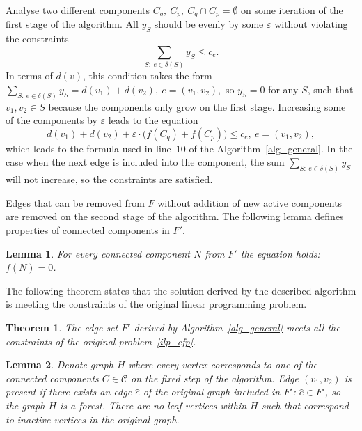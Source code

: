 \documentclass[12pt]{article}
\newtheorem{lemma}{Lemma}
\newtheorem{theorem}{Theorem}
\begin{document}
Analyse two different components $C_q,~C_p,~C_q\cap C_p=\emptyset$ on some iteration of the first stage of the algorithm. All $y_S$ should be evenly by some $\varepsilon$ without violating the constraints
 \[\sum\limits_ {S:~e\in \delta(S)}y_S\leqslant c_e. \]
In terms of $d(v)$, this condition takes the form~$\sum\limits_{S:~e\in \delta(S)}y_S = d(v_1)+d(v_2),~e=(v_1,v_2),$
so $y_S=0$ for any $S$, such that $v_1, v_2\in S$ because the components only grow on the first stage. Increasing some of the components by $\varepsilon$ leads to the  equation
 \[d(v_1)+d(v_2)+\varepsilon\cdot \bigl(f(C_q)+f(C_p)\bigr)\leqslant c_e,~e=(v_1,v_2), \]
which leads to the formula used in line~$10$ of the Algorithm~\ref{alg_general}. In the case when the next edge is included into the component, the sum $\sum\limits_{S:~e\in \delta (S)}y_S$ will not increase, so the constraints are satisfied.


Edges that can be removed from $F$ without addition of new active components are removed on the second stage of the algorithm. The following lemma defines properties of connected components in $F'$.


\begin{lemma}
  For every connected component $N$ from $F'$ the  equation holds: $f(N)=0$.
  \label{lem2}
\end{lemma}


The following theorem states that the solution derived by the described algorithm is meeting the constraints of the original linear programming problem.


\begin{theorem}
  The edge set $F'$ derived by Algorithm~\ref{alg_general} meets all the constraints of the original problem~\eqref{ilp_cfp}.
  \label{theorem1}
\end{theorem}


  \begin{lemma}
    Denote graph $H$ where every vertex corresponds to one of the connected components $C\in \mathcal{C}$ on the fixed step of the algorithm. Edge $(v_1,v_2)$ is present if there exists an edge $\hat{e}$ of the original graph included in $F'$: $\hat{e} \in F'$, so the graph $H$ is a forest. There are no leaf vertices within $H$ such that correspond to inactive vertices in the original graph.
  \label{lemma_small}
  \end{lemma}
\end{document}
